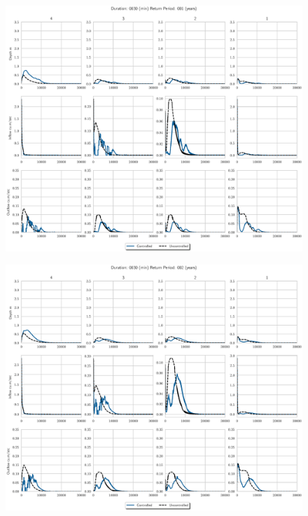 \begin{figure}
    \centering
    \includegraphics[width=\linewidth]{./RL-SI-figures/77storms/0030001.eps}
\end{figure}
\begin{figure}
    \centering
    \includegraphics[width=\linewidth]{./RL-SI-figures/77storms/0030002.eps}
\end{figure}
